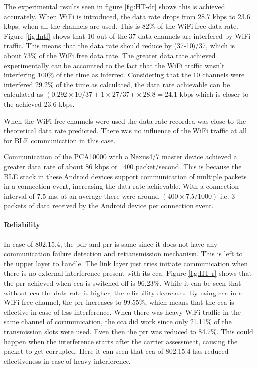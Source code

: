 The experimental results seen in figure \ref{fig:HT-dr} shows this is achieved accurately. When WiFi is introduced, the data rate drops from 28.7 kbps to 23.6 kbps, when all the channels are used. This is 82\% of the WiFi free data rate. Figure \ref{fig:Intf} shows that 10 out of the 37 data channels are interfered by WiFi traffic. This means that the data rate should reduce by (37-10)/37, which is about 73\% of the WiFi free data rate. The greater data rate achieved experimentally can be accounted to the fact that the WiFi traffic wasn't interfering 100\% of the time as inferred. Considering that the 10 channels were interfered 29.2\% of the time as calculated, the data rate achievable can be calculated as $(0.292\times10/37 + 1\times27/37)\times28.8=24.1$ kbps which is closer to the achieved 23.6 kbps.

When the WiFi free channels were used the data rate recorded was close to the theoretical data rate predicted. There was no influence of the WiFi traffic at all for BLE communication in this case.

Communication of the PCA10000 with a Nexus4/7 master device achieved a greater data rate of about 86 kbps or ~400 packet/second. This is because the BLE stack in these Android devices support communication of multiple packets in a connection event, increasing the data rate achievable. With a connection interval of 7.5 ms, at an average there were around $(400\times7.5/1000)$ i.e. 3 packets of data received by the Android device per connection event.

\paragraph{Reliability}
In case of 802.15.4, the \gls{pdr} and \gls{prr} is same since it does not have any communication failure detection and retransmission mechanism. This is left to the upper layer to handle. The link layer just tries initiate communication when there is no external interference present with its \gls{cca}. Figure \ref{fig:HT-r} shows that the \gls{prr} achieved when \gls{cca} is switched off is 96.23\%. While it can be seen that without \gls{cca} the data-rate is higher, the reliability decreases. By using \gls{cca} in a WiFi free channel, the \gls{prr} increases to 99.55\%, which means that the \gls{cca} is effective in case of less interference. When there was heavy WiFi traffic in the same channel of communication, the \gls{cca} did work since only 21.11\% of the transmission slots were used. Even then the \gls{prr} was reduced to 84.7\%. This could happen when the interference starts after the carrier assessment, causing the packet to get corrupted. Here it can seen that \gls{cca} of 802.15.4 has reduced effectiveness in case of heavy interference.

